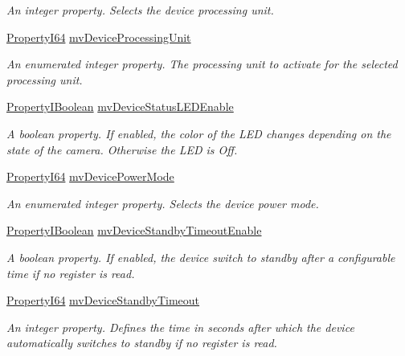 \begin{DoxyCompactItemize}
\begin{DoxyCompactList}\small\item\em An integer property. Selects the device processing unit. \end{DoxyCompactList}\item 
\hyperlink{group___common_interface_ga81749b2696755513663492664a18a893}{Property\+I64} \hyperlink{classmv_i_m_p_a_c_t_1_1acquire_1_1_gen_i_cam_1_1_device_control_a386dbee5247630990cad0156170f837a}{mv\+Device\+Processing\+Unit}
\begin{DoxyCompactList}\small\item\em An enumerated integer property. The processing unit to activate for the selected processing unit. \end{DoxyCompactList}\item 
\hyperlink{group___common_interface_ga44f9437e24b21b6c93da9039ec6786aa}{Property\+I\+Boolean} \hyperlink{classmv_i_m_p_a_c_t_1_1acquire_1_1_gen_i_cam_1_1_device_control_a1210386760746822691ccf23f0fe9d4e}{mv\+Device\+Status\+L\+E\+D\+Enable}
\begin{DoxyCompactList}\small\item\em A boolean property. If enabled, the color of the L\+E\+D changes depending on the state of the camera. Otherwise the L\+E\+D is Off. \end{DoxyCompactList}\item 
\hyperlink{group___common_interface_ga81749b2696755513663492664a18a893}{Property\+I64} \hyperlink{classmv_i_m_p_a_c_t_1_1acquire_1_1_gen_i_cam_1_1_device_control_a373e023dc2b65b6df34216eeffb895ec}{mv\+Device\+Power\+Mode}
\begin{DoxyCompactList}\small\item\em An enumerated integer property. Selects the device power mode. \end{DoxyCompactList}\item 
\hyperlink{group___common_interface_ga44f9437e24b21b6c93da9039ec6786aa}{Property\+I\+Boolean} \hyperlink{classmv_i_m_p_a_c_t_1_1acquire_1_1_gen_i_cam_1_1_device_control_a18e2fcf8bade18c057a02002aa42379b}{mv\+Device\+Standby\+Timeout\+Enable}
\begin{DoxyCompactList}\small\item\em A boolean property. If enabled, the device switch to standby after a configurable time if no register is read. \end{DoxyCompactList}\item 
\hyperlink{group___common_interface_ga81749b2696755513663492664a18a893}{Property\+I64} \hyperlink{classmv_i_m_p_a_c_t_1_1acquire_1_1_gen_i_cam_1_1_device_control_a1ffcd2e5c7d071fa6a7ea61cdeb8ccfe}{mv\+Device\+Standby\+Timeout}
\begin{DoxyCompactList}\small\item\em An integer property. Defines the time in seconds after which the device automatically switches to standby if no register is read. \end{DoxyCompactList}\end{DoxyCompactItemize}


